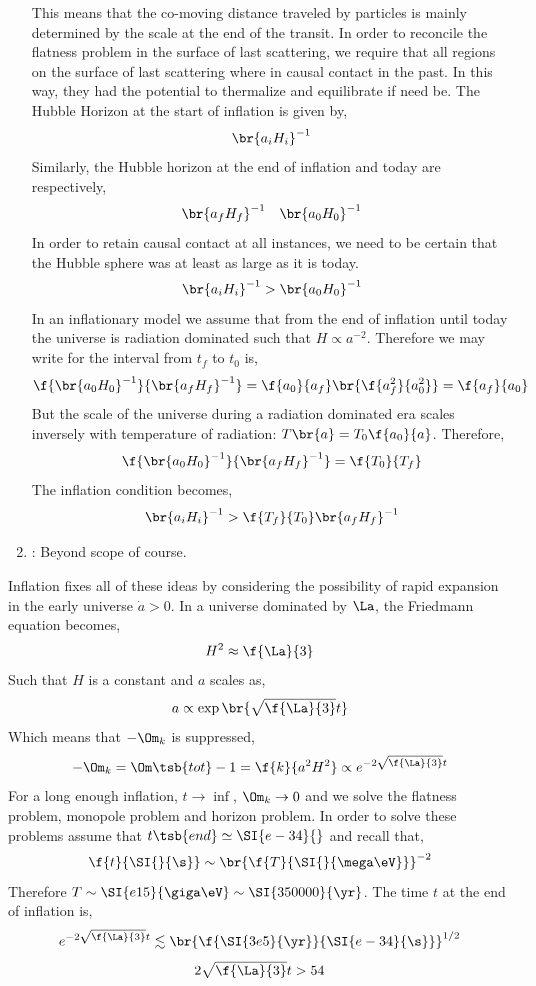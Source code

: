 \documentclass{article}
\begin{document}
\begin{enumerate}
    This means that the co-moving distance traveled by particles is mainly determined by the scale at the end of the transit. In order to reconcile the flatness problem in the surface of last scattering, we require that all regions on the surface of last scattering where in causal contact in the past. In this way, they had the potential to thermalize and equilibrate if need be. The Hubble Horizon at the start of inflation is given by,
    \[ \br{a_{i} H_{i}}^{-1} \]
    Similarly, the Hubble horizon at the end of inflation and today are respectively,
    \[ \br{a_{f} H_{f}}^{-1} \quad \br{a_{0} H_{0}}^{-1} \]
    In order to retain causal contact at all instances, we need to be certain that the Hubble sphere was at least as large as it is today.
    \[ \br{a_{i} H_{i}}^{-1} > \br{a_{0} H_{0}}^{-1} \]
    In an inflationary model we assume that from the end of inflation until today the universe is radiation dominated such that $H \propto a^{-2}$. Therefore we may write for the interval from $t_f$ to $t_0$ is,
    \[ \f{\br{a_{0} H_{0}}^{-1}}{\br{a_{f} H_{f}}^{-1}} = \f{a_0}{a_f}\br{\f{a_f^2}{a_0^2}} = \f{a_f}{a_0} \]
    But the scale of the universe during a radiation dominated era scales inversely with temperature of radiation: $T\br{a} = T_{0} \f{a_0}{a}$. Therefore,
    \[ \f{\br{a_{0} H_{0}}^{-1}}{\br{a_{f} H_{f}}^{-1}} = \f{T_0}{T_f} \]
    The inflation condition becomes,
    \[ \br{a_{i} H_{i}}^{-1} > \f{T_f}{T_0} \br{a_{f} H_{f}}^{-1} \]
    \item {}: Beyond scope of course.
\end{enumerate}

Inflation fixes all of these ideas by considering the possibility of rapid expansion in the early universe $\dot a > 0$. In a universe dominated by $\La$, the Friedmann equation becomes,
\[ H^2 \approx \f{\La}{3} \]
Such that $H$ is a constant and $a$ scales as,
\[ a \propto \exp\br{\sqrt{\f{\La}{3}} t} \]
Which means that $-\Om_k$ is suppressed,
\[ - \Om_k = \Om\tsb{tot} - 1 = \f{k}{a^2 H^2} \propto e^{- 2\sqrt{\f{\La}{3}} t} \]
For a long enough inflation, $t \to \inf$, $\Om_k \to 0$ and we solve the flatness problem, monopole problem and horizon problem. In order to solve these problems assume that $t\tsb{end} \simeq \SI{e-34}{}$ and recall that,
\[ \f{t}{\SI{}{\s}} \sim \br{\f{T}{\SI{}{\mega\eV}}}^{-2} \]
Therefore $T \sim \SI{e15}{\giga\eV} \sim \SI{350000}{\yr}$. The time $t$ at the end of inflation is,
\[ e^{- 2\sqrt{\f{\La}{3}} t} \lesssim \br{\f{\SI{3e5}{\yr}}{\SI{e-34}{\s}}}^{1/2} \]
\[ 2\sqrt{\f{\La}{3}} t > 54 \]
\end{document}
